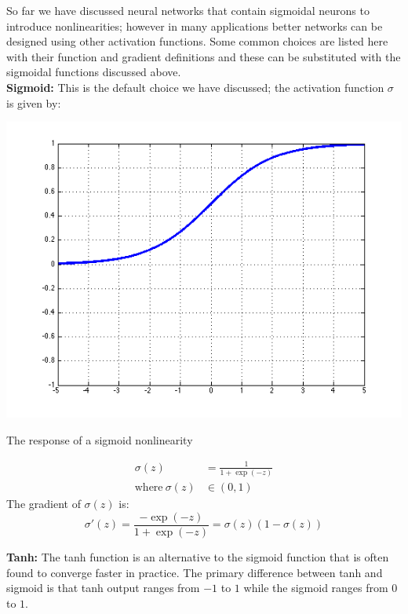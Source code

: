 \documentclass{tufte-handout}
\begin{document}
{So far we have discussed neural networks that contain sigmoidal neurons to introduce nonlinearities; however in many applications better networks can be designed using other activation functions. Some common choices are listed here with their function and gradient definitions and these can be substituted with the sigmoidal functions discussed above.
$$ $$
\textbf{Sigmoid:} This is the default choice we have discussed; the activation function $\sigma$ is given by:
\begin{marginfigure}%
  \includegraphics[width=\linewidth]{graph_sigmoid}
  \caption{The response of a sigmoid nonlinearity}
  \label{fig:graph_sigmoid}
\end{marginfigure}
\begin{align*}
  \sigma(z) &= \frac{1}{1 + \operatorname{exp}(-z)}\\
  \text{where}~\sigma(z) &\in (0, 1)
\end{align*}
The gradient of $ \sigma(z) $ is:
$$ \sigma'(z) = \frac{- \operatorname{exp}(-z)}{1 +  \operatorname{exp}(-z)} = \sigma(z) (1 - \sigma(z))$$

\textbf{Tanh:} The tanh function is an alternative to the sigmoid function that is often found to converge faster in practice. The primary difference between tanh and sigmoid is that tanh output ranges from $-1$ to $1$ while the sigmoid ranges from $0$ to $1$.

}
\end{document}
